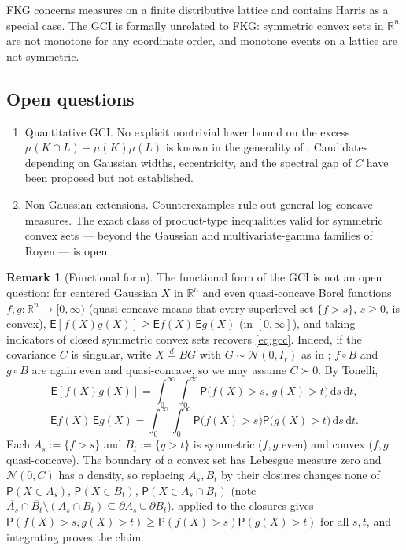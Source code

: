 \documentclass[12pt,a4paper]{article}
\theoremstyle{definition}
\newtheorem{remark}[theorem]{Remark}
\newcommand{\R}{\mathbb{R}}
\newcommand{\PP}{\mathsf{P}}
\newcommand{\EE}{\mathsf{E}}
\newcommand{\dd}{\mathrm{d}}
\newcommand{\caln}{\mathcal{N}}
\begin{document}
FKG concerns measures on a finite distributive lattice and contains
Harris as a special case.  The GCI is formally
unrelated to FKG: symmetric convex sets in $\R^n$ are not monotone
for any coordinate order, and monotone events on a lattice are not
symmetric.

\subsection{Open questions}\label{note:open}

\begin{enumerate}
  \item Quantitative GCI.  No explicit nontrivial lower bound on the
    excess $\mu(K\cap L)-\mu(K)\mu(L)$ is known in the generality of
    .  Candidates depending on Gaussian widths,
    eccentricity, and the spectral gap of $C$ have been proposed but
    not established.
  \item Non-Gaussian extensions.  Counterexamples rule out general
    log-concave measures.  The exact class of product-type
    inequalities valid for symmetric convex sets — beyond the Gaussian
    and multivariate-gamma families of Royen — is open.
\end{enumerate}

\begin{remark}[Functional form]\label{rem:functional}
  The functional form of the GCI is not an open question: for centered
  Gaussian $X$ in $\R^n$ and even quasi-concave Borel functions
  $f,g:\R^n\to[0,\infty)$ (quasi-concave means that every superlevel
  set $\{f>s\}$, $s\geqslant 0$, is convex),
  $\EE[f(X)g(X)]\geqslant\EE f(X)\,\EE g(X)$ (in $[0,\infty]$), and
  taking indicators of closed symmetric convex sets recovers
  \eqref{eq:gcc}.  Indeed, if the covariance $C$ is singular, write
  $X\overset{d}{=}BG$ with $G\sim\caln(0,I_r)$ as in
  ; $f\circ B$ and $g\circ B$ are again even and
  quasi-concave, so we may assume $C\succ 0$.  By Tonelli,
  \[
    \EE[f(X)g(X)]=\int_0^\infty\!\!\int_0^\infty
    \PP\bigl(f(X)>s,\,g(X)>t\bigr)\,\dd s\,\dd t,
  \]
  \[
    \EE f(X)\,\EE g(X)=\int_0^\infty\!\!\int_0^\infty
    \PP\bigl(f(X)>s\bigr)\PP\bigl(g(X)>t\bigr)\,\dd s\,\dd t.
  \]
  Each $A_s:=\{f>s\}$ and $B_t:=\{g>t\}$ is symmetric ($f,g$ even) and
  convex ($f,g$ quasi-concave).  The boundary of a convex set has
  Lebesgue measure zero and $\caln(0,C)$ has a density, so replacing
  $A_s,B_t$ by their closures changes none of
  $\PP(X\in A_s)$, $\PP(X\in B_t)$, $\PP(X\in A_s\cap B_t)$ (note
  $\overline{A_s}\cap\overline{B_t}\setminus(A_s\cap B_t)\subseteq
  \partial A_s\cup\partial B_t$).   applied to the
  closures gives
  $\PP(f(X)>s,g(X)>t)\geqslant\PP(f(X)>s)\PP(g(X)>t)$ for all $s,t$,
  and integrating proves the claim.
\end{remark}
\end{document}
